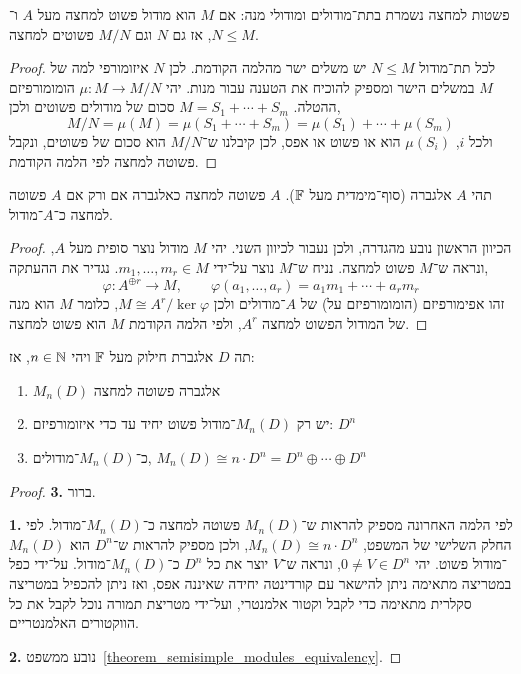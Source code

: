 \begin{lemma}
	פשטות למחצה נשמרת בתת־מודולים ומודולי מנה:
	אם $M$ הוא מודול פשוט למחצה מעל $A$ ו־$N \le M$, אז גם $N$ וגם $M / N$ פשוטים למחצה.
\end{lemma}
\begin{proof}
	לכל תת־מודול $N \le M$ יש משלים ישר מהלמה הקודמת.
	לכן $N$ איזומורפי למה של $M$ במשלים הישר ומספיק להוכיח את הטענה עבור מנות.
	יהי $\mu : M \to M / N$ הומומורפיזם ההטלה.
	$M = S_1 + \cdots + S_m$ סכום של מודולים פשוטים ולכן,
	\[
		M / N
		= \mu(M)
		= \mu(S_1 + \cdots + S_m)
		= \mu(S_1) + \cdots + \mu(S_m)
	\]
	ולכל $i$, $\mu(S_i)$ הוא או פשוט או אפס, לכן קיבלנו ש־$M / N$ הוא סכום של פשוטים, ונקבל פשוטה למחצה לפי הלמה הקודמת.
\end{proof}
\begin{lemma}\label{lemma_semisimple_algebra_iff_semisimple_module}
	תהי $A$ אלגברה (סוף־מימדית מעל $\mathbb{F}$).
	$A$ פשוטה למחצה כאלגברה אם ורק אם $A$ פשוטה למחצה כ־$A$־מודול.
\end{lemma}
\begin{proof}
	הכיוון הראשון נובע מהגדרה, ולכן נעבור לכיוון השני.
	יהי $M$ מודול נוצר סופית מעל $A$, ונראה ש־$M$ פשוט למחצה.
	נניח ש־$M$ נוצר על־ידי $m_1, \ldots, m_r \in M$.
	נגדיר את ההעתקה,
	\[
		\varphi : A^{\oplus r} \to M,
		\qquad
		\varphi(a_1, \ldots, a_r) = a_1 m_1 + \cdots + a_r m_r
	\]
	זהו אפימורפיזם (הומומורפיזם על) של $A$־מודולים ולכן $M \cong A^r / \ker \varphi$, כלומר $M$ הוא מנה של המודול הפשוט למחצה $A^r$, ולפי הלמה הקודמת $M$ הוא פשוט למחצה.
\end{proof}
\begin{theorem}
	תה $D$ אלגברת חילוק מעל $\mathbb{F}$ ויהי $n \in \mathbb{N}$, אז:
	\begin{enumerate}
		\item $M_n(D)$ אלגברה פשוטה למחצה
		\item יש רק $M_n(D)$־מודול פשוט יחיד עד כדי איזומורפיזם: $D^n$
		\item כ־$M_n(D)$־מודולים, $M_n(D) \cong n \cdot D^n = D^n \oplus \cdots \oplus D^n$
	\end{enumerate}
\end{theorem}
\begin{proof}
	\textbf{3.}
	ברור.

	\textbf{1.}
	לפי הלמה האחרונה מספיק להראות ש־$M_n(D)$ פשוטה למחצה כ־$M_n(D)$־מודול.
	לפי החלק השלישי של המשפט, $M_n(D) \cong n \cdot D^n$, ולכן מספיק להראות ש־$D^n$ הוא $M_n(D)$־מודול פשוט.
	יהי $0 \ne V \in D^n$, ונראה ש־$V$ יוצר את כל $D^n$ כ־$M_n(D)$־מודול.
	על־ידי כפל במטריצה מתאימה ניתן להישאר עם קורדינטה יחידה שאיננה אפס, ואז ניתן להכפיל במטריצה סקלרית מתאימה כדי לקבל וקטור אלמנטרי, ועל־ידי מטריצת תמורה נוכל לקבל את כל הווקטורים האלמנטריים.

	\textbf{2.}
	נובע ממשפט\ \ref{theorem_semisimple_modules_equivalency}.
\end{proof}
